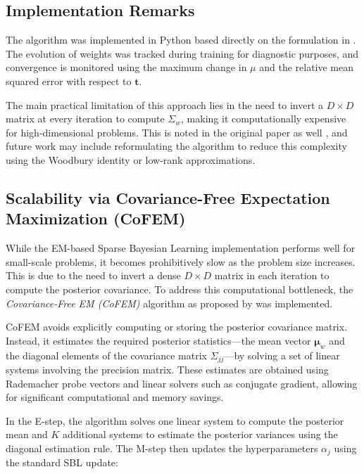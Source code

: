\documentclass{article}
\begin{document}
\subsection{Implementation Remarks}

The algorithm was implemented in Python based directly on the formulation in \citet{wipf2004sparse}. The evolution of weights was tracked during training for diagnostic purposes, and convergence is monitored using the maximum change in $\mu$ and the relative mean squared error with respect to $\mathbf{t}$.

The main practical limitation of this approach lies in the need to invert a $D \times D$ matrix at every iteration to compute $\Sigma_w$, making it computationally expensive for high-dimensional problems. This is noted in the original paper as well \cite[p.~2155]{wipf2004sparse}, and future work may include reformulating the algorithm to reduce this complexity using the Woodbury identity or low-rank approximations.

\subsection{Scalability via Covariance-Free Expectation Maximization (CoFEM)}

While the EM-based Sparse Bayesian Learning implementation performs well for small-scale problems, it becomes prohibitively slow as the problem size increases. This is due to the need to invert a dense $ D \times D $ matrix in each iteration to compute the posterior covariance. To address this computational bottleneck, the \emph{Covariance-Free EM (CoFEM)} algorithm as proposed by \citet{lin2022covariance} was implemented.

CoFEM avoids explicitly computing or storing the posterior covariance matrix. Instead, it estimates the required posterior statistics—the mean vector $ \boldsymbol{\mu}_w $ and the diagonal elements of the covariance matrix $ \Sigma_{jj} $—by solving a set of linear systems involving the precision matrix. These estimates are obtained using Rademacher probe vectors and linear solvers such as conjugate gradient, allowing for significant computational and memory savings.

In the E-step, the algorithm solves one linear system to compute the posterior mean and $ K $ additional systems to estimate the posterior variances using the diagonal estimation rule. The M-step then updates the hyperparameters $ \alpha_j $ using the standard SBL update:
\end{document}
